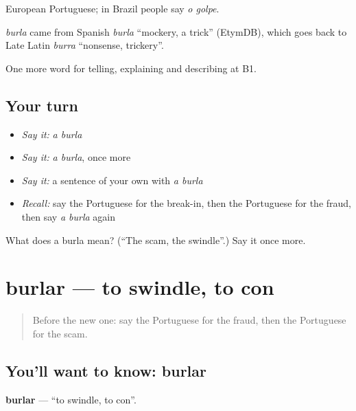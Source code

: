 European Portuguese; in Brazil people say \emph{o golpe}.

\begin{cousinweb}
\emph{burla} came from Spanish \emph{burla} \textquotedblleft{}mockery, a trick\textquotedblright{} (EtymDB), which goes back to Late Latin \emph{burra} \textquotedblleft{}nonsense, trickery\textquotedblright{}.
\end{cousinweb}

\begin{grammarlens}[title={What you've built}]
One more word for telling, explaining and describing at B1.
\end{grammarlens}

\subsection*{Your turn}
\begin{itemize}
\raggedright
  \item \emph{Say it:} \emph{a burla}
  \item \emph{Say it:} \emph{a burla}, once more
  \item \emph{Say it:} a sentence of your own with \emph{a burla}
  \item \emph{Recall:} say the Portuguese for the break-in, then the Portuguese for the fraud, then say \emph{a burla} again
\end{itemize}

\begin{tcolorbox}[breakable,colback=teal!4,colframe=teal!35!black,title={Before you move on}]
What does a burla mean? (\textquotedblleft{}The scam, the swindle\textquotedblright{}.) Say it once more.
\end{tcolorbox}
\section[burlar]{burlar — to swindle, to con}

\label{lesson:PT-C289-burlar}



\begin{quote}
Before the new one: say the Portuguese for the fraud, then the Portuguese for the scam.
\end{quote}

\subsection*{You'll want to know: burlar}
\textbf{burlar} — \textquotedblleft{}to swindle, to con\textquotedblright{}.

